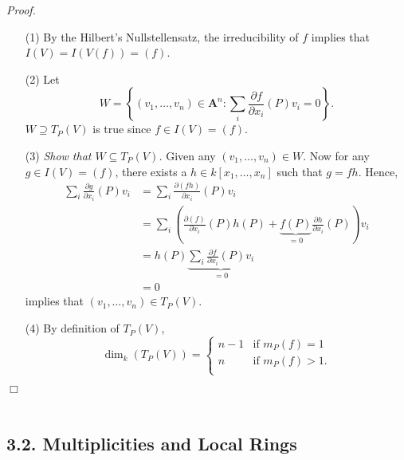 \documentclass{article}
\begin{document}
\emph{Proof.}
\begin{enumerate}
\item[(1)]
  By the Hilbert's Nullstellensatz,
  the irreducibility of $f$ implies that $I(V) = I(V(f)) = (f)$.

\item[(2)]
  Let
  \[
    W
    =
    \left\{
      (v_1, \ldots, v_n) \in \mathbf{A}^{n} :
      \sum_i \frac{\partial f}{\partial x_i}(P) v_i = 0
    \right\}.
  \]
  $W \supseteq T_P(V)$ is true since $f \in I(V) = (f)$.

\item[(3)]
  \emph{Show that $W \subseteq T_P(V)$.}
  Given any $(v_1, \ldots, v_n) \in W$.
  Now for any $g \in I(V) = (f)$, there exists a $h \in k[x_1,\ldots,x_n]$ such that $g = fh$.
  Hence,
  \begin{align*}
    \sum_i \frac{\partial g}{\partial x_i}(P) v_i
    &= \sum_i \frac{\partial (fh)}{\partial x_i}(P) v_i \\
    &= \sum_i \left(
        \frac{\partial (f)}{\partial x_i}(P) h(P)
        + \underbrace{f(P)}_{= 0} \frac{\partial h}{\partial x_i}(P)
      \right)
      v_i \\
    &= h(P) \underbrace{\sum_i \frac{\partial f}{\partial x_i}(P) v_i}_{= 0} \\
    &= 0
  \end{align*}
  implies that $(v_1, \ldots, v_n) \in T_P(V)$.

\item[(4)]
  By definition of $T_P(V)$,
  \begin{equation*}
    \dim_k(T_P(V)) =
    \begin{cases}
      n - 1 & \text{if $m_P(f) = 1$} \\
      n & \text{if $m_P(f) > 1$}. \\
    \end{cases}
  \end{equation*}
\end{enumerate}
$\Box$ \\\\






\subsection*{3.2. Multiplicities and Local Rings \\}
\end{document}
